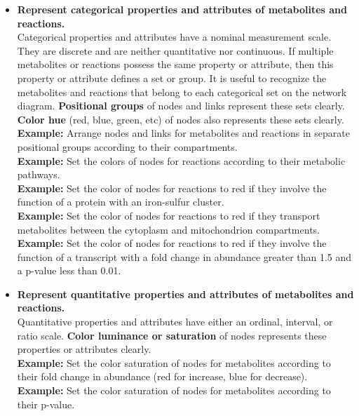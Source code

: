 \begin{enumerate}
\begin{itemize}
\item \textbf{Represent categorical properties and attributes of metabolites and reactions.}
\\ Categorical properties and attributes have a nominal measurement scale.
They are discrete and are neither quantitative nor continuous.
If multiple metabolites or reactions possess the same property or attribute, then this property or attribute defines a set or group.
It is useful to recognize the metabolites and reactions that belong to each categorical set on the network diagram.
\textbf{Positional groups} of nodes and links represent these sets clearly.
\textbf{Color hue} (red, blue, green, etc) of nodes also represents these sets clearly.
\\ \textbf{Example:} Arrange nodes and links for metabolites and reactions in separate positional groups according to their compartments.
\\ \textbf{Example:} Set the colors of nodes for reactions according to their metabolic pathways.
\\ \textbf{Example:} Set the color of nodes for reactions to red if they involve the function of a protein with an iron-sulfur cluster.
\\ \textbf{Example:} Set the color of nodes for reactions to red if they transport metabolites between the cytoplasm and mitochondrion compartments.
\\ \textbf{Example:} Set the color of nodes for reactions to red if they involve the function of a transcript with a fold change in abundance greater than 1.5 and a p-value less than 0.01.

\item \textbf{Represent quantitative properties and attributes of metabolites and reactions.}
\\ Quantitative properties and attributes have either an ordinal, interval, or ratio scale.
\textbf{Color luminance or saturation} of nodes represents these properties or attributes clearly.
\\ \textbf{Example:} Set the color saturation of nodes for metabolites according to their fold change in abundance (red for increase, blue for decrease).
\\ \textbf{Example:} Set the color saturation of nodes for metabolites according to their p-value.

\end{itemize}

\end{enumerate}

